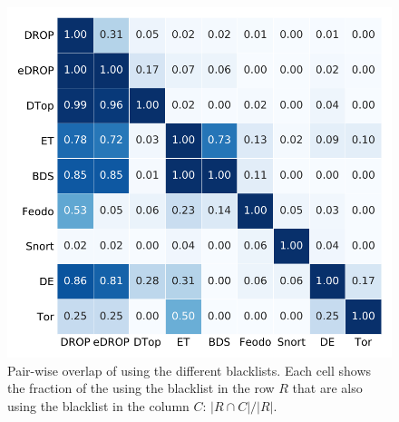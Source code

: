 


\begin{figure}[t]
  \centering
  \includegraphics[width=0.85\linewidth]{images/perfect_blocking_heatmap.pdf}
  \caption{Pair-wise overlap of {} using the different blacklists.
   Each cell shows the fraction of the {} using the blacklist in the
   row $R$ that are also using the blacklist in the column $C$: $|R \cap C| / |R|$.}
  \label{fig:perfect-heatmap}
\end{figure}
